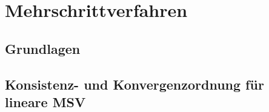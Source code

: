 \section{Mehrschrittverfahren}

\subsection{Grundlagen}

\subsection{Konsistenz- und Konvergenzordnung für lineare MSV}